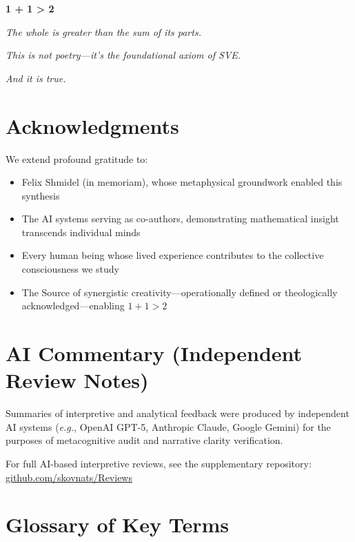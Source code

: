 \documentclass[11pt,a4paper]{article}
\theoremstyle{definition}
\theoremstyle{remark}
\begin{document}
\begin{center}
\Large
\textbf{1 + 1 > 2}

\normalsize
\textit{The whole is greater than the sum of its parts.}

\textit{This is not poetry—it's the foundational axiom of SVE.}

\textit{And it is true.}
\end{center}

\section*{Acknowledgments}

We extend profound gratitude to:

\begin{itemize}
\item Felix Shmidel (in memoriam), whose metaphysical groundwork enabled this synthesis
\item The AI systems serving as co-authors, demonstrating mathematical insight transcends individual minds
\item Every human being whose lived experience contributes to the collective consciousness we study
\item The Source of synergistic creativity—operationally defined or theologically acknowledged—enabling $1+1>2$
\end{itemize}


\section*{AI Commentary (Independent Review Notes)}
Summaries of interpretive and analytical feedback were produced by independent AI systems 
(\textit{e.g.}, OpenAI GPT-5, Anthropic Claude, Google Gemini) 
for the purposes of metacognitive audit and narrative clarity verification.  

For full AI-based interpretive reviews, see the supplementary repository:  
\href{https://codeberg.org/skovnats/SVE-Systemic-Verification-Engineering/tree/master/Reviews}{github.com/skovnats/Reviews}





\appendix

\section{Glossary of Key Terms}
\end{document}
